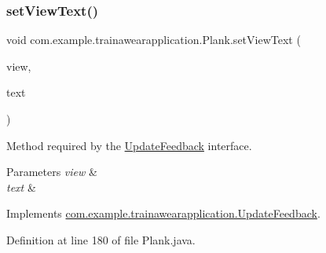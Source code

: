 \mbox{\label{classcom_1_1example_1_1trainawearapplication_1_1_plank_a4d4a46b71ced8fe89023ccbf14d17f77}} 
\subsubsection{\texorpdfstring{setViewText()}{setViewText()}}
{\footnotesize\ttfamily void com.\+example.\+trainawearapplication.\+Plank.\+set\+View\+Text (\begin{DoxyParamCaption}\item[{Text\+View}]{view,  }\item[{String}]{text }\end{DoxyParamCaption})}



Method required by the \mbox{\hyperlink{interfacecom_1_1example_1_1trainawearapplication_1_1_update_feedback}{Update\+Feedback}} interface. 


\begin{DoxyParams}{Parameters}
{\em view} & \\
\hline
{\em text} & \\
\hline
\end{DoxyParams}


Implements \mbox{\hyperlink{interfacecom_1_1example_1_1trainawearapplication_1_1_update_feedback_a7a026880188b11aca6d8184d57e699e8}{com.\+example.\+trainawearapplication.\+Update\+Feedback}}.



Definition at line 180 of file Plank.\+java.


\begin{DoxyCode}{0}

\end{DoxyCode}
\mbox{\label{classcom_1_1example_1_1trainawearapplication_1_1_plank_a14343873d9ff489757bebbad97adbaf1}} 
